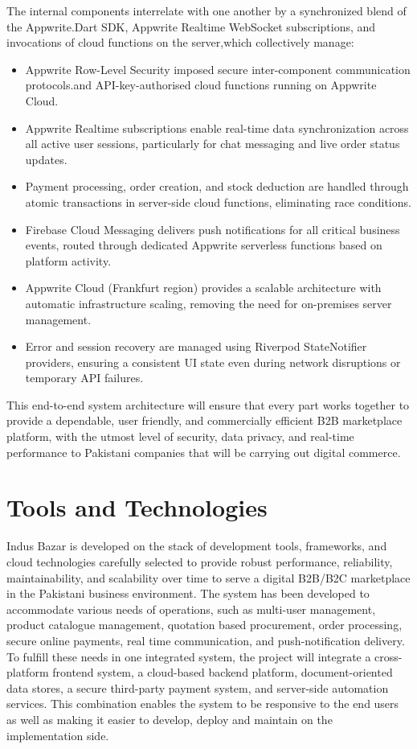 The internal components interrelate with one another by a synchronized blend of the Appwrite.Dart SDK, Appwrite Realtime WebSocket subscriptions, and invocations of cloud functions on the server,which collectively manage:
\begin{itemize}
    \item Appwrite Row-Level Security imposed secure inter-component communication protocols.and API-key-authorised cloud functions running on Appwrite Cloud.
    \item Appwrite Realtime subscriptions enable real-time data synchronization across all active user sessions, particularly for chat messaging and live order status updates.
    \item Payment processing, order creation, and stock deduction are handled through atomic transactions in server-side cloud functions, eliminating race conditions.
    \item Firebase Cloud Messaging delivers push notifications for all critical business events, routed through dedicated Appwrite serverless functions based on platform activity.
    \item Appwrite Cloud (Frankfurt region) provides a scalable architecture with automatic infrastructure scaling, removing the need for on-premises server management.
    \item Error and session recovery are managed using Riverpod StateNotifier providers, ensuring a consistent UI state even during network disruptions or temporary API failures.
\end{itemize}
This end-to-end system architecture will ensure that every part works together to provide a dependable, user friendly, and commercially efficient B2B marketplace platform, with the utmost level of security, data privacy, and real-time performance to Pakistani companies that will be carrying out digital commerce.
\section{Tools and Technologies}
Indus Bazar is developed on the stack of development tools, frameworks, and cloud technologies carefully selected to provide robust performance, reliability, maintainability, and scalability over time to serve a digital B2B/B2C marketplace in the Pakistani business environment. The system has been developed to accommodate various needs of operations, such as multi-user management, product catalogue management, quotation based procurement, order processing, secure online payments, real time communication, and push-notification delivery. To fulfill these needs in one integrated system, the project will integrate a cross-platform frontend system, a cloud-based backend platform, document-oriented data stores, a secure third-party payment system, and server-side automation services. This combination enables the system to be responsive to the end users as well as making it easier to develop, deploy and maintain on the implementation side.

